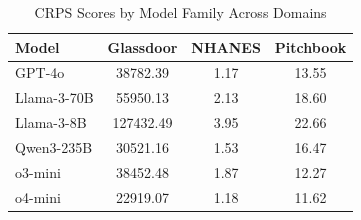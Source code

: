 \begin{table}[h]
\centering
\caption{CRPS Scores by Model Family Across Domains}
\label{tab:crps_by_model}
\begin{tabular}{lccc}
\hline
Model & Glassdoor & NHANES & Pitchbook \\
\hline
GPT-4o & 38782.39 & 1.17 & 13.55 \\
Llama-3-70B & 55950.13 & 2.13 & 18.60 \\
Llama-3-8B & 127432.49 & 3.95 & 22.66 \\
Qwen3-235B & 30521.16 & 1.53 & 16.47 \\
o3-mini & 38452.48 & 1.87 & 12.27 \\
o4-mini & 22919.07 & 1.18 & 11.62 \\
\hline
\end{tabular}
\end{table}